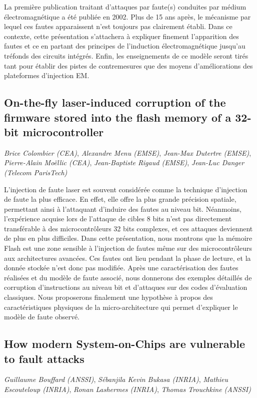 \documentclass[a4paper,11pt]{article}
\begin{document}
La première publication traitant d’attaques par faute(s) conduites par
médium électromagnétique a été publiée en 2002. Plus de 15 ans après,
le mécanisme par lequel ces fautes apparaissent n’est toujours pas
clairement établi. Dans ce contexte, cette présentation s’attachera à
expliquer finement l’apparition des fautes et ce en partant des
principes de l’induction électromagnétique jusqu’au tréfonds des
circuits intégrés. Enfin, les enseignements de ce modèle seront tirés
tant pour établir des pistes de contremesures que des moyens
d’améliorations des plateformes d’injection EM.

\subsection{On-the-fly laser-induced corruption of the firmware stored into the flash memory of a 32-bit microcontroller}
\label{sec:org6e67d3e}
\emph{Brice Colombier (CEA)}, \emph{Alexandre Menu (EMSE)}, \emph{Jean-Max Dutertre (EMSE)}, \emph{Pierre-Alain Moëllic (CEA)}, \emph{Jean-Baptiste Rigaud (EMSE)}, \emph{Jean-Luc Danger (Telecom ParisTech)}

 L'injection de faute laser est souvent considérée comme la
technique d'injection de faute la plus efficace. En effet, elle offre
la plus grande précision spatiale, permettant ainsi à l'attaquant
d'induire des fautes au niveau bit. Néanmoins, l'expérience acquise
lors de l'attaque de cibles 8 bits n'est pas directement transférable
à des microcontrôleurs 32 bits complexes, et ces attaques deviennent
de plus en plus difficiles. Dans cette présentation, nous montrons que
la mémoire Flash est une zone sensible à l'injection de fautes même
sur des microcontrôleurs aux architectures avancées. Ces fautes ont
lieu pendant la phase de lecture, et la donnée stockée n'est donc pas
modifiée. Après une caractérisation des fautes réalisées et du modèle
de faute associé, nous donnerons des exemples détaillés de corruption
d'instructions au niveau bit et d'attaques sur des codes d'évaluation
classiques. Nous proposerons finalement une hypothèse à propos des
caractéristiques physiques de la micro-architecture qui permet
d'expliquer le modèle de faute observé.

\subsection{How modern System-on-Chips are vulnerable to fault attacks}
\label{sec:org0e9f137}
\emph{Guillaume Bouffard (ANSSI)}, \emph{Sébanjila Kevin Bukasa (INRIA)},
\emph{Mathieu Escouteloup (INRIA)}, \emph{Ronan Lashermes (INRIA)}, \emph{Thomas
Trouchkine (ANSSI)}
\end{document}
